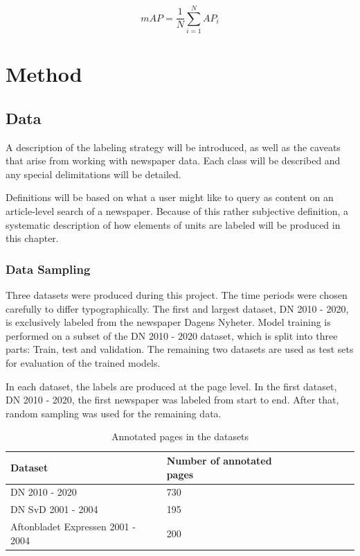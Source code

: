 \documentclass[oneside, english, bibtex]{kththesis}
\begin{document}
\begin{equation}
mAP = \frac{1}{N} \sum_{i=1}^{N} AP_i
    \label{eqn:map}
\end{equation}

\chapter{Method}
\label{ch:method}

\section{Data}

A description of the labeling strategy will be introduced, as well as the caveats that arise from working with newspaper data.
Each class will be described and any special delimitations will be detailed.

Definitions will be based on what a user might like to query as content on an article-level search of a newspaper.
Because of this rather subjective definition, a systematic description of how elements of units are labeled will be produced in this chapter.


\subsection{Data Sampling}

Three datasets were produced during this project.
The time periods were chosen carefully to differ typographically.
The first and largest dataset, DN 2010 - 2020,
is exclusively labeled from the newspaper Dagens Nyheter.
Model training is performed on a subset of the DN 2010 - 2020 dataset,
which is split into three parts: Train, test and validation.
The remaining two datasets are used as test sets for evaluation of the trained models.

In each dataset, the labels are produced at the page level.
In the first dataset, DN 2010 - 2020, the first newspaper was labeled from start to end.
After that, random sampling was used for the remaining data.

\begin{table}[H]
  \begin{center}
    \caption{Annotated pages in the datasets}
    \label{tab:pagedist}
    \begin{tabular}{l|l|l|l|l|l|l} %
    \textbf{Dataset} & \textbf{Number of annotated pages} \\
    \hline
    DN 2010 - 2020 & 730 \\    \hline
    DN SvD 2001 - 2004 & 195 \\    \hline
    Aftonbladet Expressen 2001 - 2004 & 200  \\    \hline
    \end{tabular}
  \end{center}
\end{table}
\end{document}
